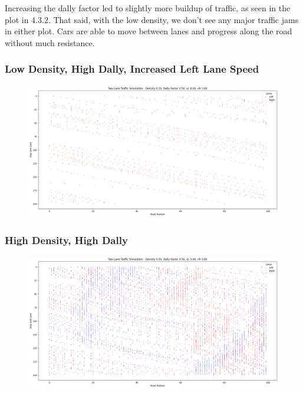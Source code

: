 \documentclass{article}
\begin{document}
Increasing the dally factor led to slightly more buildup of traffic, as seen in the plot in 4.3.2. That said, with the low density, we don't see any major traffic jams in either plot. Cars are able to move between lanes and progress along the road without much resistance. 

\newpage
\subsubsection{Low Density, High Dally, Increased Left Lane Speed}
\begin{figure}[!h]
    \centering
    \includegraphics[width=1\linewidth]{assets/two-lane-sim-d0.1-p0.5-vl8-vr3.png}
\end{figure}

\subsubsection{High Density, High Dally}
\begin{figure}[!h]
    \centering
    \includegraphics[width=1\linewidth]{assets/two-lane-sim-d0.5-p0.5-vl5-vr3.png}
\end{figure}
\end{document}
